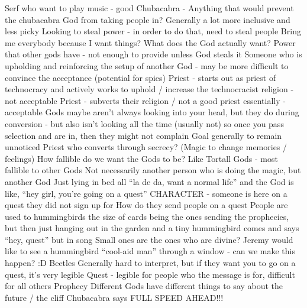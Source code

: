 \documentclass[blue]{GL2020}
\begin{document}
Serf who want to play music - good
Chubacabra - Anything that would prevent the chubacabra God from taking people in?  Generally a lot more inclusive and less picky
Looking to steal power - in order to do that, need to steal people
Bring me everybody because I want things?
What does the God actually want?
Power that other gods have - not enough to provide unless God steals it
Someone who is upholding and reinforcing the setup of another God - may be more difficult to convince the acceptance (potential for spies)
Priest - starts out as priest of technocracy and actively works to uphold / increase the technocracist religion - not acceptable
Priest - subverts their religion / not a good priest essentially - acceptable
Gods maybe aren’t always looking into your head, but they do during conversion - but also isn’t looking all the time (usually not) so once you pass selection and are in, then they might not complain
Goal generally to remain unnoticed
Priest who converts through secrecy?  (Magic to change memories / feelings)
How fallible do we want the Gods to be?
Like Tortall Gods - most fallible to other Gods
Not necessarily another person who is doing the magic, but another God
Just lying in bed all “la de da, want a normal life” and the God is like, “hey girl, you’re going on a quest”
CHARACTER - someone is here on a quest they did not sign up for
How do they send people on a quest
People are used to hummingbirds the size of cards being the ones sending the prophecies, but then just hanging out in the garden and a tiny hummingbird comes and says “hey, quest” but in song
Small ones are the ones who are divine?
Jeremy would like to see a hummingbird “cool-aid man” through a window - can we make this happen? :D
Beetles
Generally hard to interpret, but if they want you to go on a quest, it’s very legible
Quest - legible for people who the message is for, difficult for all others
Prophecy
Different Gods have different things to say about the future / the cliff
Chubacabra says FULL SPEED AHEAD!!!
\end{document}

